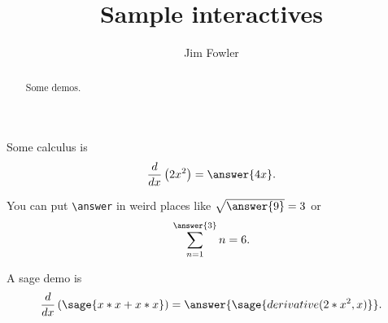 \documentclass{ximera}
\title{Sample interactives}
\author{Jim Fowler}
\begin{document}
\begin{abstract}
Some demos.
\end{abstract}
\maketitle

\begin{problem}
  Some calculus is
  \[
    \frac{d}{dx} \left( 2x^2 \right) = \answer{4x}.
  \]

  You can put \verb|\answer| in weird places like \(\sqrt{\answer{9}} = 3\) or
  \[
    \sum_{n=1}^{\answer{3}} n = 6.
  \]
\end{problem}

\begin{problem}
  A sage demo is
  \[
    \frac{d}{dx} \left( \sage{x*x + x*x} \right) =
      \answer{\sage{derivative(2*x^2,x)}}.
  \]
\end{problem}
\end{document}
